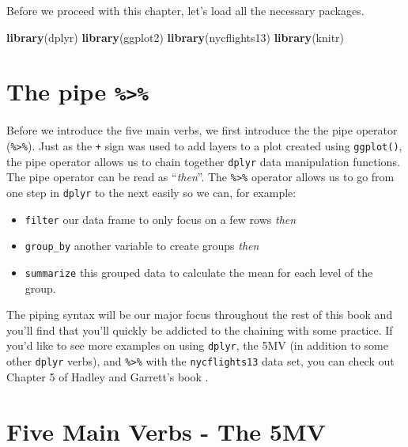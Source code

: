 \documentclass[]{tufte-book}
\newenvironment{Shaded}{\begin{snugshade}}{\end{snugshade}}
\newcommand{\KeywordTok}[1]{\textcolor[rgb]{0.13,0.29,0.53}{\textbf{{#1}}}}
\newcommand{\NormalTok}[1]{{#1}}
\providecommand{\tightlist}{%
  \setlength{\itemsep}{0pt}\setlength{\parskip}{0pt}}
\theoremstyle{definition}
\theoremstyle{definition}
\theoremstyle{remark}
\begin{document}
Before we proceed with this chapter, let's load all the necessary
packages.

\begin{Shaded}
\begin{Highlighting}[]
\KeywordTok{library}\NormalTok{(dplyr)}
\KeywordTok{library}\NormalTok{(ggplot2)}
\KeywordTok{library}\NormalTok{(nycflights13)}
\KeywordTok{library}\NormalTok{(knitr)}
\end{Highlighting}
\end{Shaded}

\section{\texorpdfstring{The pipe
\texttt{\%\textgreater{}\%}}{The pipe \%\textgreater{}\%}}\label{the-pipe}

Before we introduce the five main verbs, we first introduce the the pipe
operator (\texttt{\%\textgreater{}\%}). Just as the \texttt{+} sign was
used to add layers to a plot created using \texttt{ggplot()}, the pipe
operator allows us to chain together \texttt{dplyr} data manipulation
functions. The pipe operator can be read as ``\emph{then}''. The
\texttt{\%\textgreater{}\%} operator allows us to go from one step in
\texttt{dplyr} to the next easily so we can, for example:

\begin{itemize}
\tightlist
\item
  \texttt{filter} our data frame to only focus on a few rows \emph{then}
\item
  \texttt{group\_by} another variable to create groups \emph{then}
\item
  \texttt{summarize} this grouped data to calculate the mean for each
  level of the group.
\end{itemize}

The piping syntax will be our major focus throughout the rest of this
book and you'll find that you'll quickly be addicted to the chaining
with some practice. If you'd like to see more examples on using
\texttt{dplyr}, the 5MV (in addition to some other \texttt{dplyr}
verbs), and \texttt{\%\textgreater{}\%} with the \texttt{nycflights13}
data set, you can check out Chapter 5 of Hadley and Garrett's book
\citep{rds2016}.

\section{Five Main Verbs - The 5MV}\label{five-main-verbs---the-5mv}
\end{document}
